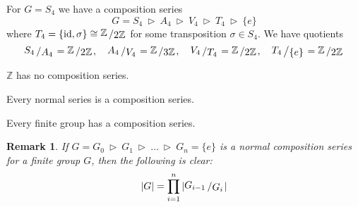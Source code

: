 \documentclass[11pt]{book}
\newtheorem{remark}[theorem]{Remark}
\theoremstyle{nonumberbreak}
\newenvironment{ex}[1][]{\ifthenelse{\equal{#1}{}}{\example}{\example[#1]}\rm}{\endexample}
\newcommand{\slant}[2]{{\raisebox{.1em}{$#1$}\left/\raisebox{-.1em}{$#2$}\right.}}
\begin{document}
\begin{spacing}{1.3}
\begin{ex}   %
\begin{compactenum}
\item For $G=S_4$ we have a composition series
$$G=S_4 \ \triangleright \ A_4 \ \triangleright \ V_4 \ \triangleright \ T_4 \ \triangleright \ \{e\}$$
where $T_4=\{\textrm{id}, \sigma\} \cong \slant{\mathbb{Z}}{2 \mathbb{Z}}$ for some transposition $\sigma \in S_4$.
We have quotients
$$\slant{S_4}{A_4}=\slant{\mathbb{Z}}{2 \mathbb{Z}}, \quad \slant{A_4}{V_4}=\slant{\mathbb{Z}}{3 \mathbb{Z}}, \quad \slant{V_4}{T_4}=\slant{\mathbb{Z}}{2 \mathbb{Z}}, \quad \slant{T_4}{\{e\}}=\slant{\mathbb{Z}}{2 \mathbb{Z}}$$
\item $\mathbb{Z}$ has no composition series.
\item Every normal series is a composition series.
\item Every finite group has a composition series.
\end{compactenum}
\end{ex}

\begin{remark} %
If $G=G_0 \ \triangleright \ G_1 \ \triangleright \ \ldots \ \triangleright \ G_n= \{e\}$ is a normal composition series for a finite group $G$, then the following is clear:
$$\vert G \vert = \prod_{i=1}^{n} \vert \slant{G_{i-1}}{G_i} \vert$$
\end{remark}



\end{spacing}
\end{document}
